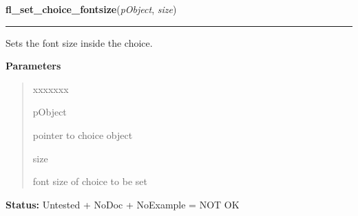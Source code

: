 \hspace{.8\funcindent}\begin{boxedminipage}{\funcwidth}

    \raggedright \textbf{fl\_set\_choice\_fontsize}(\textit{pObject}, \textit{size})

    \vspace{-1.5ex}

    \rule{\textwidth}{0.5\fboxrule}
\setlength{\parskip}{2ex}
    Sets the font size inside the choice.

\setlength{\parskip}{1ex}
      \textbf{Parameters}
      \vspace{-1ex}

      \begin{quote}
        \begin{Ventry}{xxxxxxx}

          \item[pObject]

          pointer to choice object

          \item[size]

          font size of choice to be set

        \end{Ventry}

      \end{quote}

\textbf{Status:} Untested + NoDoc + NoExample = NOT OK



    \end{boxedminipage}

    \label{xformslib:library:fl_set_choice_fontstyle}

    \vspace{0.5ex}

